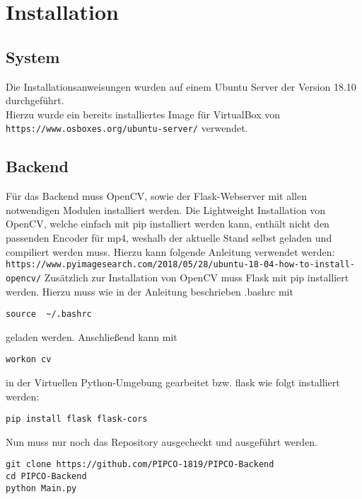 \chapter{Installation}

\section{System}
Die Installationsanweisungen wurden auf einem Ubuntu Server der Version 18.10 durchgeführt.\\
Hierzu wurde ein bereits installiertes Image für VirtualBox von \\ \texttt{https://www.osboxes.org/ubuntu-server/} verwendet.
  
\section{Backend}
Für das Backend muss OpenCV, sowie der Flask-Webserver mit allen notwendigen Modulen installiert werden.
Die Lightweight Installation von OpenCV, welche einfach mit pip installiert werden kann, enthält nicht den passenden Encoder für mp4, weshalb der aktuelle Stand selbst geladen und compiliert werden muss.
Hierzu kann folgende Anleitung verwendet werden:\\
\texttt{https://www.pyimagesearch.com/2018/05/28/ubuntu-18-04-how-to-install-opencv/}
Zusätzlich zur Installation von OpenCV muss Flask mit pip installiert werden.
Hierzu muss wie in der Anleitung beschrieben .bashrc mit 
\begin{lstlisting}[frame=single]
source  ~/.bashrc
\end{lstlisting}
geladen werden.
Anschließend kann mit
\begin{lstlisting}[frame=single]
workon cv
\end{lstlisting} in der Virtuellen Python-Umgebung gearbeitet bzw. flask wie folgt installiert werden:
\begin{lstlisting}[frame=single]
pip install flask flask-cors
\end{lstlisting}
Nun muss nur noch das Repository ausgecheckt und ausgeführt werden.
\begin{lstlisting}[frame=single]
git clone https://github.com/PIPCO-1819/PIPCO-Backend
cd PIPCO-Backend
python Main.py
\end{lstlisting}

